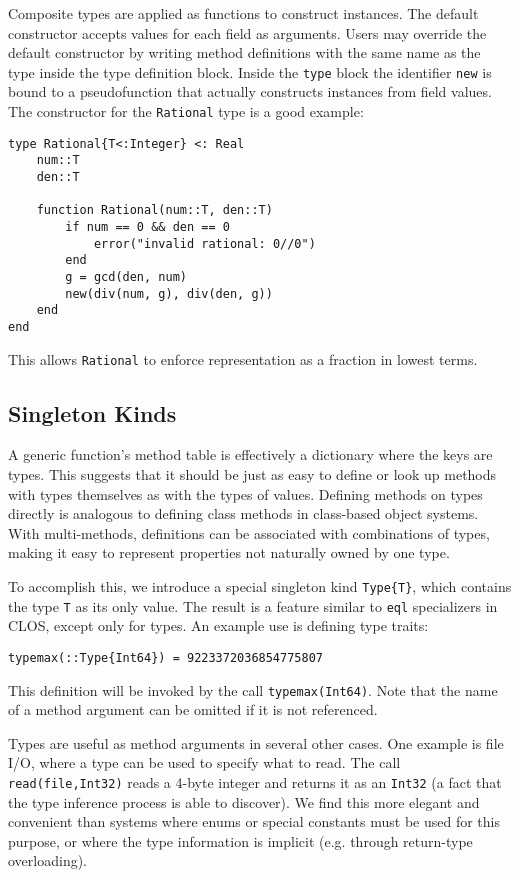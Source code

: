 \documentclass[9pt]{sigplanconf}
\begin{document}
Composite types are applied as functions to construct instances.
The default constructor accepts values for each field as arguments.
Users may override the default constructor by writing method definitions
with the same name as the type inside the type definition block. Inside the
{\tt type} block the identifier {\tt new} is bound to a pseudofunction
that actually constructs instances from field values. The constructor
for the {\tt Rational} type is a good example:

\begin{verbatim}
type Rational{T<:Integer} <: Real
    num::T
    den::T

    function Rational(num::T, den::T)
        if num == 0 && den == 0
            error("invalid rational: 0//0")
        end
        g = gcd(den, num)
        new(div(num, g), div(den, g))
    end
end
\end{verbatim}

This allows {\tt Rational} to enforce representation as a fraction in
lowest terms.

\subsection{Singleton Kinds}

A generic function's method table is effectively a dictionary where the keys
are types. This suggests that it should be just as easy to define or look up
methods with types themselves as with the types of values. Defining methods on
types directly is analogous to defining class methods in class-based object
systems. With multi-methods, definitions can be associated with combinations
of types, making it easy to represent properties not naturally owned by one
type.

To accomplish this, we introduce a special singleton kind {\tt Type\{T\}},
which contains the type {\tt T} as its only value.
The result is a feature similar to {\tt eql}
specializers in CLOS, except only for types. An example use is defining
type traits:

\begin{verbatim}
typemax(::Type{Int64}) = 9223372036854775807
\end{verbatim}

This definition will be invoked by the call {\tt typemax(Int64)}. Note that
the name of a method argument can be omitted if it is not referenced.

Types are useful as method arguments in several other cases. One example is
file I/O, where a type can be used to specify what to read. The call
{\tt read(file,Int32)} reads a 4-byte integer and returns it as an {\tt Int32}
(a fact that the type inference process is able to discover). We find this
more elegant and convenient than systems where enums or special constants must
be used for this purpose, or where the type information is implicit
(e.g. through return-type overloading).
\end{document}
